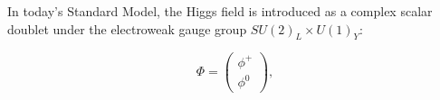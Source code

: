 









In today's Standard Model, the Higgs field is introduced as a complex scalar doublet under the electroweak gauge group \( SU(2)_L \times U(1)_Y \):

\begin{equation}
\label{eq:higgscalar}
    \Phi = \begin{pmatrix} \phi^+ \\ \phi^0 \end{pmatrix},
\end{equation}

